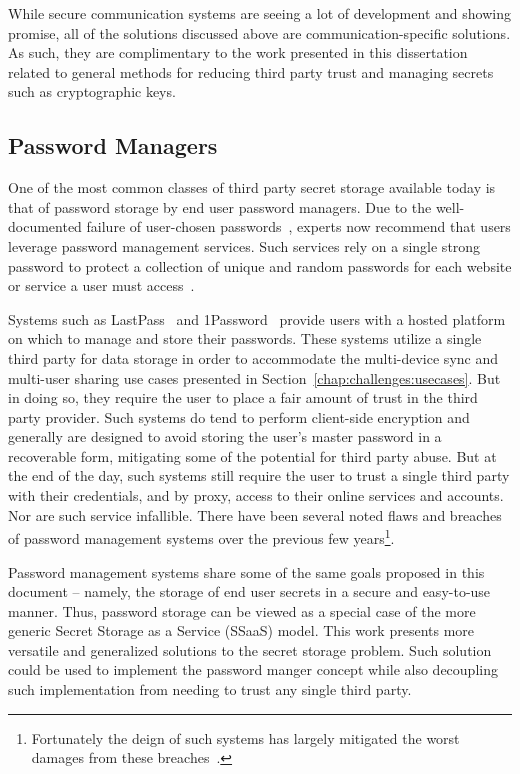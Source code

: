 While secure communication systems are seeing a lot of development and
showing promise, all of the solutions discussed above are
communication-specific solutions. As such, they are complimentary to
the work presented in this dissertation related to general methods for
reducing third party trust and managing secrets such as cryptographic
keys.

\subsection{Password Managers}

One of the most common classes of third party secret storage available
today is that of password storage by end user password managers. Due
to the well-documented failure of user-chosen
passwords~\cite{goodin-bible, goodin-passwords}, experts now recommend
that users leverage password management services. Such services rely
on a single strong password to protect a collection of unique and
random passwords for each website or service a user must
access~\cite{schneier-passwords, krebs-passwords, brodkin-passman}.

Systems such as LastPass~\cite{lastpass} and
1Password~\cite{onepassword} provide users with a hosted platform on
which to manage and store their passwords. These systems utilize a
single third party for data storage in order to accommodate the
multi-device sync and multi-user sharing use cases presented in
Section~\ref{chap:challenges:usecases}. But in doing so, they require
the user to place a fair amount of trust in the third party
provider. Such systems do tend to perform client-side encryption and
generally are designed to avoid storing the user's master password in
a recoverable form, mitigating some of the potential for third party
abuse. But at the end of the day, such systems still require the user
to trust a single third party with their credentials, and by proxy,
access to their online services and accounts. Nor are such service
infallible. There have been several noted flaws and breaches of
password management systems over the previous few
years\footnote{Fortunately the deign of such systems has largely
  mitigated the worst damages from these
  breaches~\cite{ducklin2015}.}\cite{blackhat-lastpass,
  changedmy-lastpass, lastpass-blog-breach}.

Password management systems share some of the same goals proposed in
this document -- namely, the storage of end user secrets in a secure
and easy-to-use manner. Thus, password storage can be viewed as a
special case of the more generic Secret Storage as a Service (SSaaS)
model. This work presents more versatile and generalized solutions to
the secret storage problem. Such solution could be used to implement
the password manger concept while also decoupling such implementation
from needing to trust any single third party.

